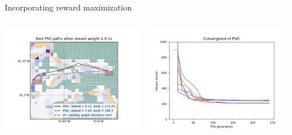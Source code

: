 \documentclass[9pt,xcolor=table]{beamer}
\begin{document}
\begin{frame}{Incorporating reward maximization}
    \begin{columns}
        \begin{column}{0.33\textwidth}
            \includegraphics[width=1.2\textwidth,trim={3cm 0cm 0cm 0cm},clip]{img/paths_FP1_RW0.1.png}
        \end{column}
        \begin{column}{0.31\textwidth}
            \includegraphics[width=\textwidth,trim={0cm 0cm 2.5cm 0cm},clip]{img/FP1_RW0.1_convergence.png}
        \end{column}
        \begin{column}{0.37\textwidth}

\end{column}
\end{columns}
\end{frame}
\end{document}
